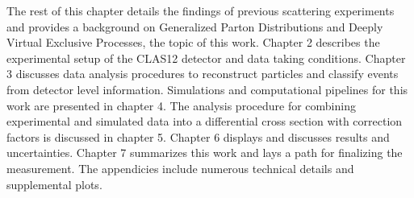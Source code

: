 The rest of this chapter details the findings of previous scattering experiments and provides a background on Generalized Parton Distributions and Deeply Virtual Exclusive Processes, the topic of this work. Chapter 2 describes the experimental setup of the CLAS12 detector and data taking conditions. Chapter 3 discusses data analysis procedures to reconstruct particles and classify events from detector level information. Simulations and computational pipelines for this work are presented in chapter 4. The analysis procedure for combining experimental and simulated data into a differential cross section with correction factors is discussed in chapter 5. Chapter 6 displays and discusses results and uncertainties. Chapter 7 summarizes this work and lays a path for finalizing the measurement. The appendicies include numerous technical details and supplemental plots. 



